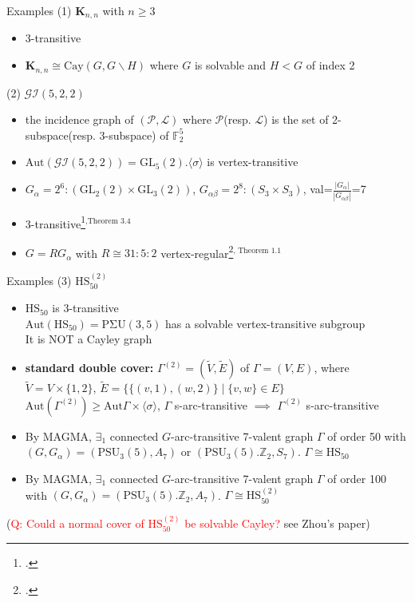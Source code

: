 \documentclass{beamer}
\def\GL{\mathrm{GL}}
\def\PSU{\mathrm{PSU}}
\def\PSigU{\mathrm{P\Sigma U}}
\def\Aut{\mathrm{Aut}}
\def\Cay{\mathrm{Cay}}
\def\HS{\mathrm{HS}}
\def\GI{\mathcal{GI}}
\begin{document}
\begin{frame}{Examples}
(1) $\mathbf{K}_{n,n}$ with $n\geq 3$
\begin{itemize}
	\item 3-transitive
	\item $\mathbf{K}_{n,n}\cong \Cay(G,G\backslash H)$ where $G$ is solvable and $H<G$ of index 2
\end{itemize}

(2) $\mathcal{GI}(5,2,2)$
\begin{itemize}
	\item the incidence graph of $(\mathcal{P,L})$ where $\mathcal{P}$(resp. $\mathcal{L}$) is the set of 2-subspace(resp. 3-subspace) of $\mathbb{F}_2^5$
	\item $\Aut(\GI(5,2,2))=\GL_5(2).\langle \sigma\rangle$ is vertex-transitive
	\item $G_\alpha=2^6:(\GL_2(2)\times\GL_3(2))$, $G_{\alpha\beta}=2^8:(S_3\times S_3)$, val=$\frac{|G_\alpha|}{|G_{\alpha\beta}|}$=7
	\item 3-transitive\footcite{LI20162907}$^\text{,Theorem 3.4}$
	\item $G=RG_\alpha$ with $R\cong 31:5:2$ vertex-regular\footcite{LI2022factorizations}$^\text{, Theorem 1.1}$
\end{itemize}

\end{frame}

\begin{frame}{Examples}
(3) $\HS_{50}^{(2)}$
\begin{itemize}
	\item $\HS_{50}$ is 3-transitive \\$\Aut(\HS_{50})=\PSigU(3,5)$ has a solvable vertex-transitive subgroup\\ It is NOT a Cayley graph
	\item \textbf{standard double cover:} $\Gamma^{(2)}=(\tilde{V},\tilde{E})$ of $\Gamma=(V,E)$, where\\ $\tilde{V}=V\times\{1,2\}$, $\tilde{E}=\{\{(v,1),(w,2)\}\mid\{v,w\}\in E\}$\\ $\Aut(\Gamma^{(2)})\geq \Aut\Gamma\times\langle\sigma\rangle$, $\Gamma$ s-arc-transitive $\implies$ $\Gamma^{(2)}$ s-arc-transitive
	\item By MAGMA, $\exists_1$ connected $G$-arc-transitive 7-valent graph $\Gamma$ of order 50 with $(G,G_\alpha)=(\PSU_3(5),A_7)$ or $(\PSU_3(5).\mathbb{Z}_2,S_7)$. $\Gamma\cong \HS_{50}$
	\item By MAGMA, $\exists_1$ connected $G$-arc-transitive 7-valent graph $\Gamma$ of order 100 with $(G,G_\alpha)=(\PSU_3(5).\mathbb{Z}_2,A_7)$. $\Gamma\cong \HS_{50}^{(2)}$
\end{itemize}
(\textcolor{red}{Q: Could a normal cover of $\HS_{50}^{(2)}$ be solvable Cayley?} see Zhou's paper)
\end{frame}
\end{document}
